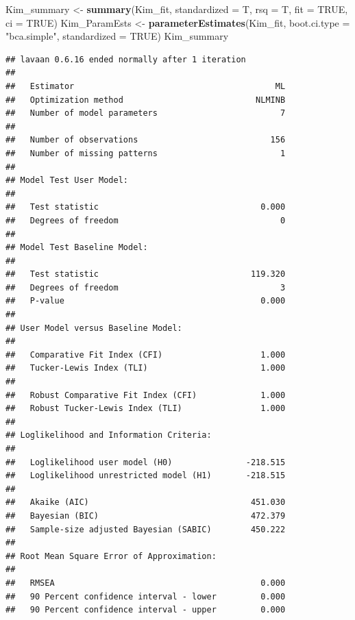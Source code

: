 \documentclass[
  11pt,
]{book}
\newenvironment{Shaded}{\begin{snugshade}}{\end{snugshade}}
\newcommand{\AttributeTok}[1]{\textcolor[rgb]{0.27,0.27,0.27}{#1}}
\newcommand{\ConstantTok}[1]{\textcolor[rgb]{0.37,0.37,0.37}{#1}}
\newcommand{\FunctionTok}[1]{\textcolor[rgb]{0.27,0.27,0.27}{\textbf{#1}}}
\newcommand{\NormalTok}[1]{#1}
\newcommand{\OtherTok}[1]{\textcolor[rgb]{0.37,0.37,0.37}{#1}}
\newcommand{\StringTok}[1]{\textcolor[rgb]{0.5,0.5,0.5}{#1}}
\begin{document}
\begin{Shaded}
\begin{Highlighting}[]
\NormalTok{Kim\_summary }\OtherTok{\textless{}{-}} \FunctionTok{summary}\NormalTok{(Kim\_fit, }\AttributeTok{standardized =}\NormalTok{ T, }\AttributeTok{rsq =}\NormalTok{ T, }\AttributeTok{fit =} \ConstantTok{TRUE}\NormalTok{,}
    \AttributeTok{ci =} \ConstantTok{TRUE}\NormalTok{)}
\NormalTok{Kim\_ParamEsts }\OtherTok{\textless{}{-}} \FunctionTok{parameterEstimates}\NormalTok{(Kim\_fit, }\AttributeTok{boot.ci.type =} \StringTok{"bca.simple"}\NormalTok{,}
    \AttributeTok{standardized =} \ConstantTok{TRUE}\NormalTok{)}
\NormalTok{Kim\_summary}
\end{Highlighting}
\end{Shaded}

\begin{verbatim}
## lavaan 0.6.16 ended normally after 1 iteration
## 
##   Estimator                                         ML
##   Optimization method                           NLMINB
##   Number of model parameters                         7
## 
##   Number of observations                           156
##   Number of missing patterns                         1
## 
## Model Test User Model:
##                                                       
##   Test statistic                                 0.000
##   Degrees of freedom                                 0
## 
## Model Test Baseline Model:
## 
##   Test statistic                               119.320
##   Degrees of freedom                                 3
##   P-value                                        0.000
## 
## User Model versus Baseline Model:
## 
##   Comparative Fit Index (CFI)                    1.000
##   Tucker-Lewis Index (TLI)                       1.000
##                                                       
##   Robust Comparative Fit Index (CFI)             1.000
##   Robust Tucker-Lewis Index (TLI)                1.000
## 
## Loglikelihood and Information Criteria:
## 
##   Loglikelihood user model (H0)               -218.515
##   Loglikelihood unrestricted model (H1)       -218.515
##                                                       
##   Akaike (AIC)                                 451.030
##   Bayesian (BIC)                               472.379
##   Sample-size adjusted Bayesian (SABIC)        450.222
## 
## Root Mean Square Error of Approximation:
## 
##   RMSEA                                          0.000
##   90 Percent confidence interval - lower         0.000
##   90 Percent confidence interval - upper         0.000

\end{verbatim}
\end{document}
